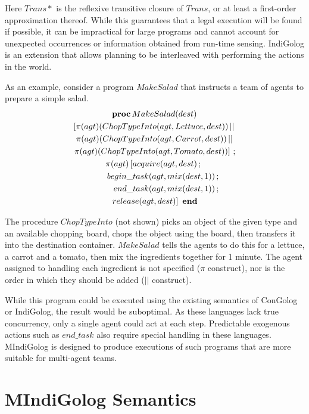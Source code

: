 \documentclass[letterpaper]{article}
\begin{document}
Here $Trans*$ is the reflexive transitive closure of $Trans$, or at least a
first-order approximation thereof.
While this guarantees that a legal execution
will be found if possible, it can be impractical for large programs
and cannot account for unexpected occurrences or information obtained
from run-time sensing.  IndiGolog \cite{giacomo99indigolog} is an extension
that allows planning to be interleaved with performing the actions in the world.

As an example, consider a program $MakeSalad$ that instructs a team of
agents to prepare a simple salad.
\begin{multline}
\label{eqn:MakeSalad}
\mathbf{proc}\,MakeSalad(dest)\\
\left[\pi(agt)(ChopTypeInto(agt,Lettuce,dest))\,||\right.\\
\pi(agt)(ChopTypeInto(agt,Carrot,dest))\,||\\
\left.\pi(agt)(ChopTypeInto(agt,Tomato,dest))\right]\,;\\
\pi(agt)\left[acquire(agt,dest)\,;\right.\\
 \shoveright{begin\_task(agt,mix(dest,1))\,;\quad}\\
 \shoveright{end\_task(agt,mix(dest,1))\,;\quad}\\
 \left.release(agt,dest)\right]\,\,\mathbf{end}
\end{multline}

The procedure $ChopTypeInto$ (not shown) picks an object of the given
type and an available chopping board, chops the object using the board,
then transfers it into the destination container. $MakeSalad$ tells
the agents to do this for a lettuce, a carrot and a tomato, then mix
the ingredients together for 1 minute. The agent assigned to handling
each ingredient is not specified ($\pi$ construct), nor is the order in which
they should be added ($||$ construct). 

While this program could be executed using the existing semantics of ConGolog
or IndiGolog, the result would be suboptimal.  As these languages lack true
concurrency, only a single agent could act at each step.
Predictable exogenous actions such
as $end\_task$ also require special handling in these languages.  MIndiGolog
is designed to produce executions of such programs that are more suitable for
multi-agent teams.

\section{MIndiGolog Semantics}
\end{document}
